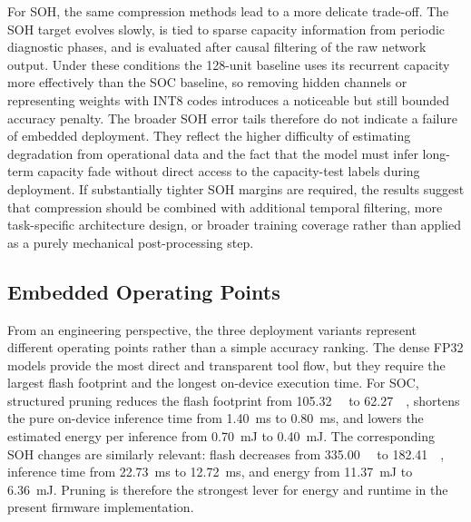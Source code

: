 \documentclass[
    a4paper,
    12pt,
    titlepage,
    bibliography=totoc,
    twoside=on,
    parskip=false,
    numbers=noenddot,
    cleardoublepage=empty,
    DIV=12,
    BCOR=12.0mm,
    headheight=36pt,
    headings=openright
]{scrreprt}
\begin{document}
For SOH, the same compression methods lead to a more delicate trade-off. The SOH target evolves slowly, is tied to sparse capacity information from periodic diagnostic phases, and is evaluated after causal filtering of the raw network output. Under these conditions the 128-unit baseline uses its recurrent capacity more effectively than the SOC baseline, so removing hidden channels or representing weights with INT8 codes introduces a noticeable but still bounded accuracy penalty. The broader SOH error tails therefore do not indicate a failure of embedded deployment. They reflect the higher difficulty of estimating degradation from operational data and the fact that the model must infer long-term capacity fade without direct access to the capacity-test labels during deployment. If substantially tighter SOH margins are required, the results suggest that compression should be combined with additional temporal filtering, more task-specific architecture design, or broader training coverage rather than applied as a purely mechanical post-processing step.

\subsection{Embedded Operating Points}
From an engineering perspective, the three deployment variants represent different operating points rather than a simple accuracy ranking. The dense FP32 models provide the most direct and transparent tool flow, but they require the largest flash footprint and the longest on-device execution time. For SOC, structured pruning reduces the flash footprint from \SI{105.32}{\kilo\byte} to \SI{62.27}{\kilo\byte}, shortens the pure on-device inference time from \SI{1.40}{\milli\second} to \SI{0.80}{\milli\second}, and lowers the estimated energy per inference from \SI{0.70}{\milli\joule} to \SI{0.40}{\milli\joule}. The corresponding SOH changes are similarly relevant: flash decreases from \SI{335.00}{\kilo\byte} to \SI{182.41}{\kilo\byte}, inference time from \SI{22.73}{\milli\second} to \SI{12.72}{\milli\second}, and energy from \SI{11.37}{\milli\joule} to \SI{6.36}{\milli\joule}. Pruning is therefore the strongest lever for energy and runtime in the present firmware implementation.
\end{document}
